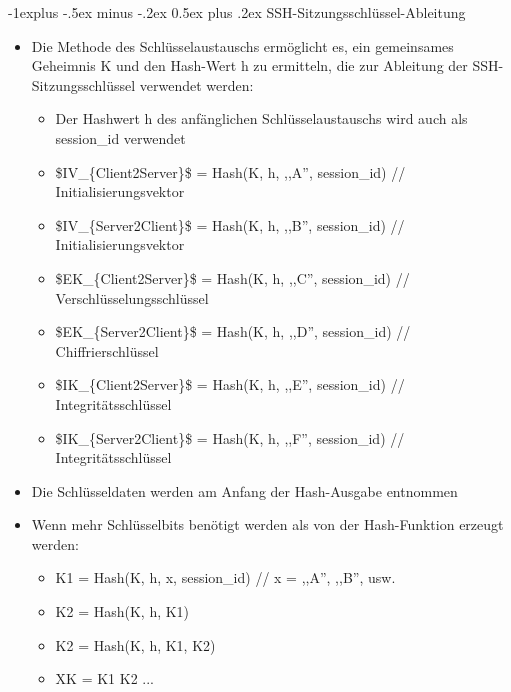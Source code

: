 \documentclass[a4paper]{article}
\makeatletter
\renewcommand{\subsection}{\@startsection{subsection}{2}{0mm}%
 {-1explus -.5ex minus -.2ex}%
 {0.5ex plus .2ex}%
 {\normalfont\normalsize\bfseries}}
\makeatother
\begin{document}
\begin{multicols}{3}
    \subsection{SSH-Sitzungsschlüssel-Ableitung}

    \begin{itemize}
        \item
              Die Methode des Schlüsselaustauschs ermöglicht es, ein gemeinsames
              Geheimnis K und den Hash-Wert h zu ermitteln, die zur Ableitung der
              SSH-Sitzungsschlüssel verwendet werden:

              \begin{itemize}
                  \item
                        Der Hashwert h des anfänglichen Schlüsselaustauschs wird auch als
                        session\_id verwendet
                  \item
                        \$IV\_\{Client2Server\}\$ = Hash(K, h, ,,A'', session\_id) //
                        Initialisierungsvektor
                  \item
                        \$IV\_\{Server2Client\}\$ = Hash(K, h, ,,B'', session\_id) //
                        Initialisierungsvektor
                  \item
                        \$EK\_\{Client2Server\}\$ = Hash(K, h, ,,C'', session\_id) //
                        Verschlüsselungsschlüssel
                  \item
                        \$EK\_\{Server2Client\}\$ = Hash(K, h, ,,D'', session\_id) //
                        Chiffrierschlüssel
                  \item
                        \$IK\_\{Client2Server\}\$ = Hash(K, h, ,,E'', session\_id) //
                        Integritätsschlüssel
                  \item
                        \$IK\_\{Server2Client\}\$ = Hash(K, h, ,,F'', session\_id) //
                        Integritätsschlüssel
              \end{itemize}
        \item
              Die Schlüsseldaten werden am Anfang der Hash-Ausgabe entnommen
        \item
              Wenn mehr Schlüsselbits benötigt werden als von der Hash-Funktion
              erzeugt werden:

              \begin{itemize}
                  \item
                        K1 = Hash(K, h, x, session\_id) // x = ,,A'', ,,B'', usw.
                  \item
                        K2 = Hash(K, h, K1)
                  \item
                        K2 = Hash(K, h, K1, K2)
                  \item
                        XK = K1 \textbar\textbar{} K2 \textbar\textbar{} ...
              \end{itemize}
    \end{itemize}



\end{multicols}
\end{document}
